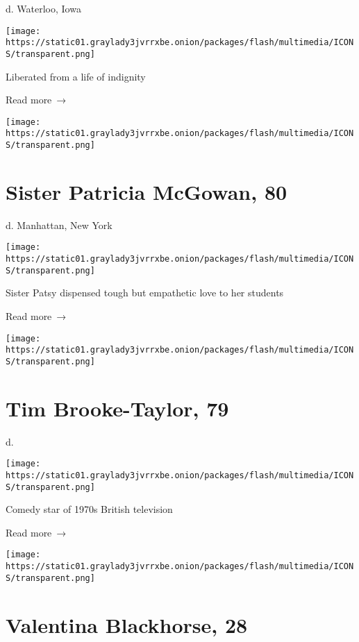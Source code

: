 d. Waterloo, Iowa

\texttt{[image: https://static01.graylady3jvrrxbe.onion/packages/flash/multimedia/ICONS/transparent.png]}

Liberated from a life of indignity

 Read more~→

\href{https://www.nytimes3xbfgragh.onion/2020/04/30/obituaries/patricia-mcgowan-dead-coronavirus.html}{}

\texttt{[image: https://static01.graylady3jvrrxbe.onion/packages/flash/multimedia/ICONS/transparent.png]}

\hypertarget{sister-patricia-mcgowan-80}{%
\section{Sister Patricia McGowan, 80}\label{sister-patricia-mcgowan-80}}

d. Manhattan, New York

\texttt{[image: https://static01.graylady3jvrrxbe.onion/packages/flash/multimedia/ICONS/transparent.png]}

Sister Patsy dispensed tough but empathetic love to her students

 Read more~→

\href{https://www.nytimes3xbfgragh.onion/2020/04/30/arts/television/tim-brooke-taylor-dead-coronavirus.html}{}

\texttt{[image: https://static01.graylady3jvrrxbe.onion/packages/flash/multimedia/ICONS/transparent.png]}

\hypertarget{tim-brooke-taylor-79}{%
\section{Tim Brooke-Taylor, 79}\label{tim-brooke-taylor-79}}

d.

\texttt{[image: https://static01.graylady3jvrrxbe.onion/packages/flash/multimedia/ICONS/transparent.png]}

Comedy star of 1970s British television

 Read more~→

\href{https://www.nytimes3xbfgragh.onion/2020/04/30/obituaries/valentina-blackhorse-dead-coronavirus.html}{}

\texttt{[image: https://static01.graylady3jvrrxbe.onion/packages/flash/multimedia/ICONS/transparent.png]}

\hypertarget{valentina-blackhorse-28}{%
\section{Valentina Blackhorse, 28}\label{valentina-blackhorse-28}}

